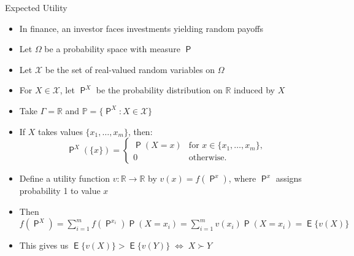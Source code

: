 \documentclass[10pt,handout]{beamer}
\newcommand{\ifff}{\;\Longleftrightarrow\;}
\DeclareMathOperator\prb{\mathsf{P}}
\DeclareMathOperator\expc{\mathsf{E}}
\theoremstyle{definition}
\begin{document}
\begin{frame}{Expected Utility}
  \begin{itemize}[<+->]
    \item In finance, an investor faces investments yielding random payoffs
    \item Let $\Omega$ be a probability space with measure $\prb$
    \item Let $\mathcal{X}$ be the set of real-valued random variables on $\Omega$
    \item For $X \in \mathcal{X}$, let $\prb^X$ be the probability distribution on $\mathbb{R}$ induced by $X$
    \item Take $\Gamma = \mathbb{R}$ and $\mathbb{P} = \{\prb^X : X \in \mathcal{X}\}$
    \item If $X$ takes values $\{x_1, \ldots, x_m\}$, then:
      \[\prb^X(\{x\}) = 
      \begin{cases}
      \prb(X = x) & \text{for } x \in \{x_1, \ldots, x_m\}, \\
      0 & \text{otherwise}.
      \end{cases}\]
    \item Define a utility function $v: \mathbb{R} \to \mathbb{R}$ by $v(x) = f(\prb^x)$, where $\prb^x$ assigns probability 1 to value $x$
    \item Then $f(\prb^X) = \sum_{i=1}^m f(\prb^{x_i})\prb(X = x_i) = \sum_{i=1}^m v(x_i)\prb(X = x_i) = \expc\{v(X)\}$
    \item This gives us $\expc\{v(X)\} > \expc\{v(Y)\} \ifff X \succ Y$
  \end{itemize}
\end{frame}
\end{document}
